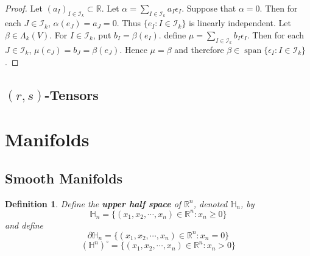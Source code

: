 \documentclass[12pt]{amsart}
\newtheorem{defn}[thm]{Definition}
\newcommand{\al}{\alpha}
\newcommand{\bet}{\beta}
\newcommand{\Lam}{\Lambda}
\newcommand{\ep}{\epsilon}
\renewcommand{\H}{\mathbb{H}}
\newcommand{\R}{\mathbb{R}}
\newcommand{\MI}{\mathcal{I}}
\DeclareMathOperator{\vspan}{span}
\begin{document}
	\begin{proof}
		Let $(a_I)_{I \in \MI_k} \subset \R$. Let $\al = \sum_{I \in \MI_k}a_I \ep_I$. Suppose that $\al = 0$. Then for each $J \in \MI_k$, $\al(e_J) = a_J = 0$. Thus $\{e_I: I \in \MI_k\}$ is linearly independent. Let $\bet \in \Lam_k(V)$. For $I \in \MI_k$, put $b_I = \bet(e_I)$. define $\mu = \sum_{I \in \MI_k} b_I\ep_I$. Then for each $J \in \MI_k$, $\mu(e_J) = b_J = \bet(e_J)$. Hence $\mu = \bet$ and therefore $\bet \in \vspan \{\ep_I:I \in \MI_k\}$.
	\end{proof}
	
	
	
	
	
	
	
	
	
	
	
	
	
	
	
	
	
	\subsection{$(r,s)$-Tensors}
	
	
	
	
	
	
	
	
	
	
	
	
	
	
	
	
	
	
	
	
	
	
	
	
	
	
	
	
	
	
	

	\newpage
	
	\section{Manifolds}
	
	\subsection{Smooth Manifolds}
	
	\begin{defn}
		Define the \textbf{upper half space} of $\R^n$, denoted $\H_n$, by $$\H_n = \{(x_1, x_2, \cdots, x_n) \in \R^n: x_n \geq 0\}$$ and define $$\partial\H_n = \{(x_1, x_2, \cdots, x_n) \in \R^n: x_n = 0\}$$ 
		$$(\H^n)^{\circ} = \{(x_1, x_2, \cdots, x_n) \in \R^n: x_n > 0\}$$
	\end{defn}
	
\end{document}
